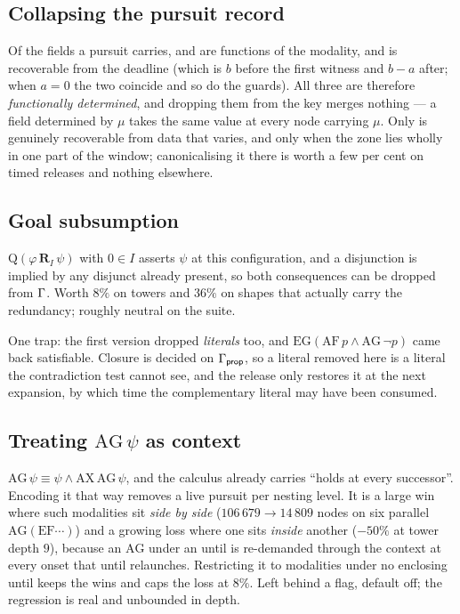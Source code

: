 \subsection{Collapsing the pursuit record}

Of the fields a pursuit carries,  and  are functions
of the modality, and  is recoverable from the deadline (which is
$b$ before the first witness and $b-a$ after; when $a=0$ the two coincide and so
do the guards). All three are therefore \emph{functionally determined}, and
dropping them from the key merges nothing --- a field determined by $\mu$ takes
the same value at every node carrying $\mu$. Only  is genuinely
recoverable from data that varies, and only when the zone lies wholly in one
part of the window; canonicalising it there is worth a few per cent on timed
releases and nothing elsewhere.

\subsection{Goal subsumption}

$\mathrm{Q}(\varphi\,\mathbf{R}_I\,\psi)$ with $0\in I$ asserts $\psi$ at this
configuration, and a disjunction is implied by any disjunct already present, so
both consequences can be dropped from $\Gamma$. Worth $8\%$ on towers and $36\%$
on shapes that actually carry the redundancy; roughly neutral on the suite.

One trap: the first version dropped \emph{literals} too, and
$\mathrm{EG}(\mathrm{AF}\,p\wedge\mathrm{AG}\,\neg p)$ came back satisfiable.
Closure is decided on $\Gamma_{\mathsf{prop}}$, so a literal removed here is a
literal the contradiction test cannot see, and the release only restores it at
the next expansion, by which time the complementary literal may have been
consumed.

\subsection{Treating $\mathrm{AG}\,\psi$ as context}

$\mathrm{AG}\,\psi\equiv\psi\wedge\mathrm{AX}\,\mathrm{AG}\,\psi$, and the
calculus already carries ``holds at every successor''. Encoding it that way
removes a live pursuit per nesting level. It is a large win where such
modalities sit \emph{side by side} ($106\,679\to 14\,809$ nodes on six parallel
$\mathrm{AG}(\mathrm{EF}\cdots)$) and a growing loss where one sits
\emph{inside} another ($-50\%$ at tower depth $9$), because an $\mathrm{AG}$
under an until is re-demanded through the context at every onset that until
relaunches. Restricting it to modalities under no enclosing until keeps the wins
and caps the loss at $8\%$. Left behind a flag, default off; the regression is
real and unbounded in depth.

